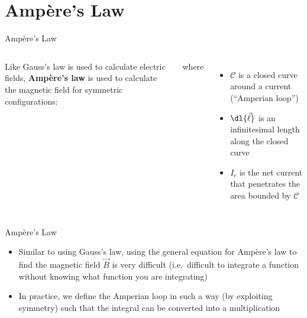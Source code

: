 \documentclass[12pt,aspectratio=169]{beamer}
\begin{document}
\section{Amp\`{e}re's Law}

\begin{frame}{Amp\`{e}re's Law}
  \begin{columns}
    
    Like Gauss's law is used to calculate electric fields,
    \textbf{Amp\`{e}re's law} is used to calculate the magnetic field for
    symmetric configurations:

    where
    \begin{itemize}
    \item $\mathcal C$ is a closed curve around a current (``Amperian loop'')
    \item $\dl{\vec\ell}$ is an infinitesimal length along the closed curve
    \item $I_c$ is the net current that penetrates the area bounded by
      $\mathcal C$
    \end{itemize}
  \end{columns}
\end{frame}



\begin{frame}{Amp\`{e}re's Law}
  
  \begin{itemize}
  \item Similar to using Gauss's law, using the general equation for
    Amp\`{e}re's law to find the magnetic field $\vec B$ is very difficult
    (i.e.\ difficult to integrate a function without knowing what function
    you are integrating)
  \item In practice, we define the Amperian loop in such a way (by exploiting
    symmetry) such that the integral can be converted into a multiplication

  \end{itemize}
\end{frame}
\end{document}
